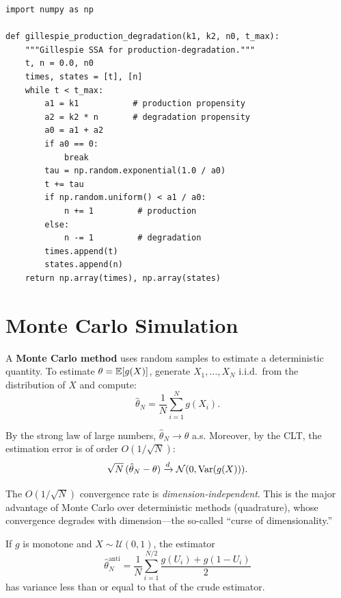 \begin{verbatim}
import numpy as np

def gillespie_production_degradation(k1, k2, n0, t_max):
    """Gillespie SSA for production-degradation."""
    t, n = 0.0, n0
    times, states = [t], [n]
    while t < t_max:
        a1 = k1           # production propensity
        a2 = k2 * n       # degradation propensity
        a0 = a1 + a2
        if a0 == 0:
            break
        tau = np.random.exponential(1.0 / a0)
        t += tau
        if np.random.uniform() < a1 / a0:
            n += 1         # production
        else:
            n -= 1         # degradation
        times.append(t)
        states.append(n)
    return np.array(times), np.array(states)
\end{verbatim}

\section{Monte Carlo Simulation}
\label{sec:monte_carlo}

\begin{definition}
A \textbf{Monte Carlo method} uses random samples to estimate a
deterministic quantity. To estimate $\theta = \mathbb{E}[g(X)]$, generate
$X_1, \ldots, X_N$ i.i.d.\ from the distribution of $X$ and compute:
\[
  \hat{\theta}_N = \frac{1}{N} \sum_{i=1}^N g(X_i).
\]
\end{definition}

\begin{theorem}
By the strong law of large numbers, $\hat{\theta}_N \to \theta$ a.s.
Moreover, by the CLT, the estimation error is of order $O(1/\sqrt{N})$:
\[
  \sqrt{N}\,(\hat{\theta}_N - \theta) \xrightarrow{d}
  \mathcal{N}(0, \mathrm{Var}(g(X))).
\]
\end{theorem}

\begin{intuition}
The $O(1/\sqrt{N})$ convergence rate is \emph{dimension-independent}.
This is the major advantage of Monte Carlo over deterministic methods
(quadrature), whose convergence degrades with dimension---the so-called
``curse of dimensionality.''
\end{intuition}

\begin{proposition}
If $g$ is monotone and $X \sim \mathcal{U}(0,1)$, the estimator
\[
  \hat{\theta}_N^{\text{anti}} = \frac{1}{N}\sum_{i=1}^{N/2}
  \frac{g(U_i) + g(1-U_i)}{2}
\]
has variance less than or equal to that of the crude estimator.
\end{proposition}

